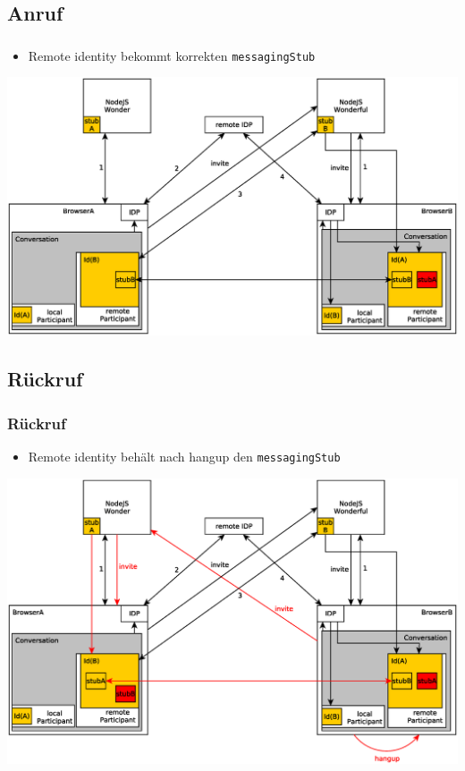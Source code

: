 \documentclass{beamer}
\begin{document}
\subsection{Anruf}
\begin{frame}
	\frametitle{}
	\begin{itemize}[<+->]
		\item Remote identity bekommt korrekten \texttt{messagingStub}
	\end{itemize}
	\includegraphics[scale=0.365,centered]{pictures/anruf1}
\end{frame}

\subsection{Rückruf}
\begin{frame}
	\frametitle{Rückruf}
	\begin{itemize}[<+->]
		\item Remote identity behält nach hangup den \texttt{messagingStub} %
	\end{itemize}
	\includegraphics[scale=0.365,centered]{pictures/anruf2}
\end{frame}
\end{document}
